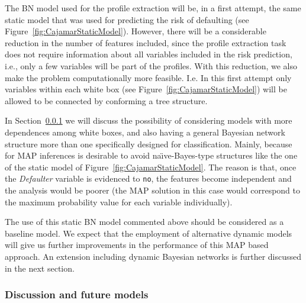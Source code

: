 The BN model used for the profile extraction will be, in a first attempt, the same static model that was used for predicting the risk of defaulting (see Figure~\ref{fig:CajamarStaticModel}). However, there will be a considerable reduction in the number of features included, since the profile extraction task does not require information about all variables included in the risk prediction, i.e., only a few variables will be part of the profiles. With this reduction, we also make the problem computationally more feasible. I.e. In this first attempt only variables within each white box (see Figure~\ref{fig:CajamarStaticModel}) will be allowed to be connected by conforming a tree structure. 

In Section~\ref{subsubsec:CajamarDiscussion} we will discuss the possibility of considering models with more dependences among white boxes, and also having a general Bayesian network structure more than one specifically designed for classification. Mainly, because for MAP inferences is desirable to avoid na\"{\i}ve-Bayes-type structures like the one of the static model of Figure~\ref{fig:CajamarStaticModel}. The reason is that, once the \emph{Defaulter} variable is evidenced to \texttt{no}, the features become independent and the analysis would be poorer (the MAP solution in this case would correspond to the maximum probability value for each variable individually).

The use of this static BN model commented above should be considered as a baseline model. We expect that the employment of alternative dynamic models will give us further improvements in the performance of this MAP based approach. An extension including dynamic Bayesian networks is further discussed in the next section.


 
\subsubsection{Discussion and future models}\label{subsubsec:CajamarDiscussion}

